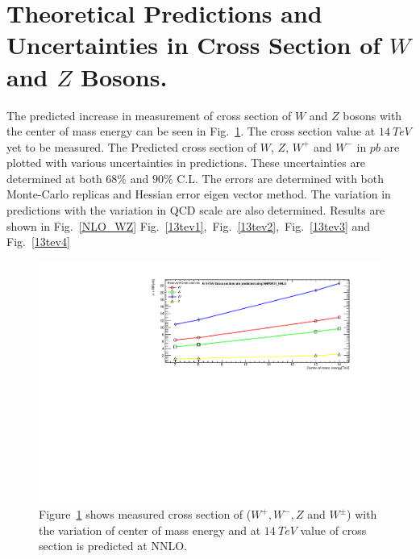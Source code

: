 \section{Theoretical Predictions and Uncertainties in Cross Section of $W$ and $Z$ Bosons.}
The predicted increase in measurement of cross section of $W$ and $Z$ bosons with the center of mass energy can be seen in Fig.~\ref{pre_inc}. The cross section value at $14~TeV$ yet to be measured. The Predicted cross section of $W$, $Z$, $W^{+}$ and $W^{-}$ in $pb$ are plotted with various uncertainties in predictions. These uncertainties are determined at both $68\%$ and $90\%$ C.L. The errors are determined with both Monte-Carlo replicas and Hessian error eigen vector method. The variation in predictions with the variation in QCD scale are also determined. Results are shown in Fig.~\ref{NLO_WZ} Fig.~\ref{13tev1},~Fig.~\ref{13tev2},~Fig.~\ref{13tev3} and Fig.~\ref{13tev4} 
\begin{figure}[H]
    \centering
    \includegraphics[scale=0.7]{chapter4/Com_var.pdf}
    \caption{Figure~\ref{pre_inc} shows measured cross section of ($W^{+},W^{-},Z$ and $W^{\pm}$) with the variation of center of mass energy and at $14~TeV$ value of cross section is predicted at NNLO.}
    \label{pre_inc}
\end{figure}



